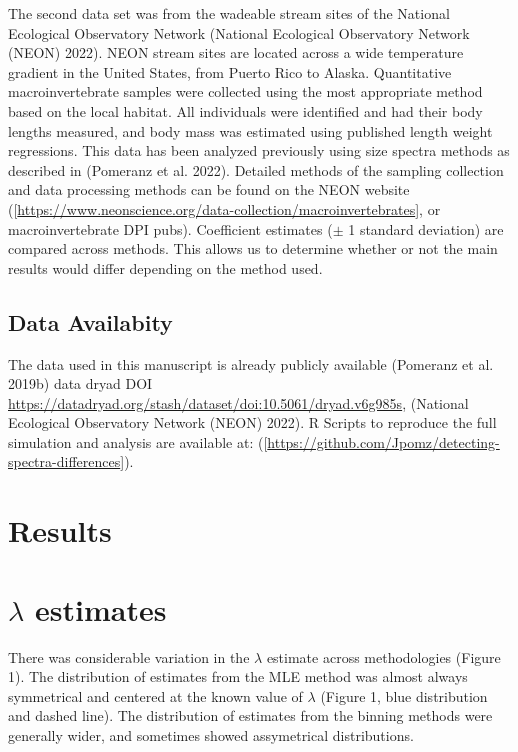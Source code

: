 \documentclass[
]{article}
\begin{document}
The second data set was from the wadeable stream sites of the National
Ecological Observatory Network (National Ecological Observatory Network
(NEON) 2022). NEON stream sites are located across a wide temperature
gradient in the United States, from Puerto Rico to Alaska. Quantitative
macroinvertebrate samples were collected using the most appropriate
method based on the local habitat. All individuals were identified and
had their body lengths measured, and body mass was estimated using
published length weight regressions. This data has been analyzed
previously using size spectra methods as described in (Pomeranz et al.
2022). Detailed methods of the sampling collection and data processing
methods can be found on the NEON website
({[}\url{https://www.neonscience.org/data-collection/macroinvertebrates}{]},
or macroinvertebrate DPI pubs). Coefficient estimates (\(\pm\) 1
standard deviation) are compared across methods. This allows us to
determine whether or not the main results would differ depending on the
method used.

\hypertarget{data-availabity}{%
\subsection{Data Availabity}\label{data-availabity}}

The data used in this manuscript is already publicly available (Pomeranz
et al. 2019b) data dryad DOI
\url{https://datadryad.org/stash/dataset/doi:10.5061/dryad.v6g985s},
(National Ecological Observatory Network (NEON) 2022). R Scripts to
reproduce the full simulation and analysis are available at:
({[}\url{https://github.com/Jpomz/detecting-spectra-differences}{]}).

\hypertarget{results}{%
\section{Results}\label{results}}

\hypertarget{lambda-estimates}{%
\section{\texorpdfstring{\(\lambda\)
estimates}{\textbackslash lambda estimates}}\label{lambda-estimates}}

There was considerable variation in the \(\lambda\) estimate across
methodologies (Figure 1). The distribution of estimates from the MLE
method was almost always symmetrical and centered at the known value of
\(\lambda\) (Figure 1, blue distribution and dashed line). The
distribution of estimates from the binning methods were generally wider,
and sometimes showed assymetrical distributions.
\end{document}
